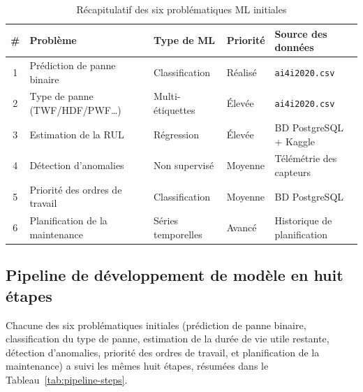 \begin{table}[h]
\centering
\begin{tabularx}{\textwidth}{|c|X|X|X|X|}
\toprule
\textbf{\#} & \textbf{Problème} & \textbf{Type de ML} & \textbf{Priorité} & \textbf{Source des données} \\
\midrule
1 & Prédiction de panne binaire & Classification & Réalisé & \texttt{ai4i2020.csv} \\
\midrule
2 & Type de panne (TWF/HDF/PWF\ldots) & Multi-étiquettes & Élevée & \texttt{ai4i2020.csv} \\
\midrule
3 & Estimation de la RUL & Régression & Élevée & BD PostgreSQL + Kaggle \\
\midrule
4 & Détection d'anomalies & Non supervisé & Moyenne & Télémétrie des capteurs \\
\midrule
5 & Priorité des ordres de travail & Classification & Moyenne & BD PostgreSQL \\
\midrule
6 & Planification de la maintenance & Séries temporelles & Avancé & Historique de planification \\
\bottomrule
\end{tabularx}
\caption{Récapitulatif des six problématiques ML initiales}
\label{tab:six-problems-summary}
\end{table}

\subsection{Pipeline de développement de modèle en huit étapes}

Chacune des six problématiques initiales (prédiction de panne binaire, classification du type de panne, estimation de la durée de vie utile restante, détection d'anomalies, priorité des ordres de travail, et planification de la maintenance) a suivi les mêmes huit étapes, résumées dans le Tableau~\ref{tab:pipeline-steps}.

